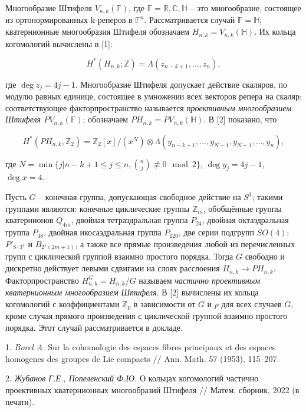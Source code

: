 
\vzmscaption

Многообразие Штифеля $V_{n,k}(\mathbb{F})$, где $\mathbb{F} = \mathbb{R}, \mathbb{C}, \mathbb{H}$ -- это многообразие, состоящее из ортонормированных k-реперов в $\mathbb{F}^n$. Рассматривается случай $\mathbb{F} = \mathbb{H}$; кватернионные многообразия Штифеля обозначаем $H_{n,k} = V_{n,k}(\mathbb{H})$. Их кольца когомологий вычислены в [1]:

$$H^*(H_{n,k}; \mathbb{Z}) = \Lambda(z_{n-k+1}, \ldots, z_n),$$

где $\deg z_j = 4j - 1$. Многообразие Штифеля допускает действие скаляров, по модулю равных единице, состоящее в умножении всех векторов репера на скаляр; соответствующее факторпространство называется \emph{проективным многообразием Штифеля $PV_{n,k}(\mathbb{F})$}; обозначаем $PH_{n,k}=PV_{n,k}(\mathbb{H})$. В [2] показано, что

$$H^*(PH_{n,k}, \mathbb{Z}_2) = \mathbb{Z}_2[x]/(x^N) \otimes \Lambda(y_{n-k+1}, \ldots, y_{N-1}, y_{N+1}, \ldots, y_n),$$

где $N = \min \{j | n - k + 1 \leqslant j \leqslant n, \binom{n}{j} \not\equiv 0 \mod 2\}$, $\deg y_j = 4j - 1$, $\deg x = 4$.

Пусть $G$ -- конечная группа, допускающая свободное действие на $S^3$; такими группами являются: конечные циклические группы $\mathbb{Z}_m$, обобщённые группы кватернионов $Q_{4m}$, двойная тетраэдральная группа $P_{24}$, двойная октаэдральная группа $P_{48}$, двойная икосаэдральная группа $P_{120}$, две серии подгрупп $SO(4)$: $P'_{8\cdot3^s}$ и $B_{2^s(2m+1)}$, а также все прямые произведения любой из перечисленных групп с циклической группой взаимно простого порядка. Тогда $G$ свободно и дискретно действует левыми сдвигами на слоях расслоения $H_{n,k} \to PH_{n,k}$. Факторпространство $H^G_{n,k} = H_{n,k}/G$ называем \emph{частично проективным кватернионным многообразием Штифеля}. В [2] вычислены их кольца когомологий с коэффициентами $\mathbb{Z}_p$ в зависимости от $G$ и $p$ для всех случаев $G$, кроме случая прямого произведения с циклической группой взаимно простого порядка. Этот случай рассматривается в докладе.


\litlist

1. \emph{Borel A.} Sur la cohomologie des espaces fibres principaux et des espaces homogenes
des groupes de Lie compacts // Ann. Math. 57 (1953), 115–207.

2. \emph{Жубанов Г.Е., Попеленский Ф.Ю.} О кольцах когомологий частично проективных кватернионных многообразий Штифеля // Матем. сборник, 2022 (в печати).
